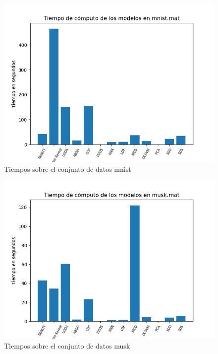 \begin{figure}[H]
	\centering
	\includegraphics[scale=0.7]{imagenes/imgs-exp1/times/mnist}
	\caption{Tiempos sobre el conjunto de datos mnist}
	\label{mnist_times}
\end{figure}

\begin{figure}[H]
	\centering
	\includegraphics[scale=0.7]{imagenes/imgs-exp1/times/musk}
	\caption{Tiempos sobre el conjunto de datos musk}
	\label{musk_times}
\end{figure}

